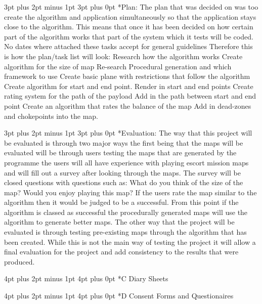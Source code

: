 \documentclass[12pt,a4paper,oneside]{book}
\makeatletter
\renewcommand\subsection{\@startsection {subsection}{1}{2mm} %
                               {3pt plus 2pt minus 1pt} %
                               {3pt plus 0pt} %
                               {\normalfont\bfseries}}
\renewcommand\section{\@startsection {section}{1}{0mm} %
                               {4pt plus 2pt minus 1pt} %
                               {4pt plus 0pt} %
                               {\bfseries}}
\makeatother
\begin{document}
\begin{appendices}
\subsection*{Plan:}
The plan that was decided on was too create the algorithm and application simultaneously so that the application stays close to the algorithm. This means that once it has been decided on how certain part of the algorithm works that part of the system which it tests will be coded. No dates where attached these tasks accept for general guidelines Therefore this is how the plan/task list will look:
Research how the algorithm works 
Create algorithm for the size of map
Re-search Procedural generation and which framework to use
Create basic plane with restrictions that follow the algorithm
Create algorithm for start and end point.
Render in start and end points
Create rating system for the path of the payload
Add in the path between start and end point 
Create an algorithm that rates the balance of the map 
Add in dead-zones and chokepoints into the map. 

\subsection*{Evaluation:}
The way that this project will be evaluated is through two major ways the first being that the maps will be evaluated will be through users testing the maps that are generated by the programme the users will all have experience with playing escort mission maps and will fill out a survey after looking through the maps. The survey will be closed questions with questions such as: What do you think of the size of the map? Would you enjoy playing this map? If the users rate the map similar to the algorithm then it would be judged to be a successful. From this point if the algorithm is classed as successful the procedurally generated maps will use the algorithm to generate better maps. The other way that the project will be evaluated is through testing pre-existing maps through the algorithm that has been created. While this is not the main way of testing the project it will allow a final evaluation for the project and add consistency to the results that were produced.    

\section*{C Diary Sheets}

\section*{D Consent Forms and Questionaires}

\end{appendices}
\end{document}
